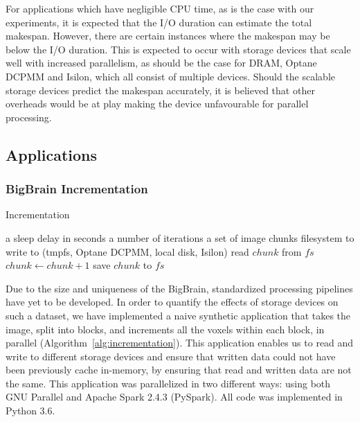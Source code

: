 \documentclass[conference]{IEEEtran}
\newcommand{\Desc}[2]{\State \makebox[2em][l]{#1}#2}
\newcommand{\bigbrain}{BigBrain\xspace}
\begin{document}
For applications which have negligible CPU time, as is the case with our experiments, 
it is expected that the I/O duration can estimate the total makespan. However, there
are certain instances where the makespan may be below the I/O duration. This is expected
to occur with storage devices that scale well with increased parallelism, as should be the
case for DRAM, Optane DCPMM and Isilon, which all consist of multiple devices. Should the
scalable storage devices predict the makespan accurately, it is believed that other overheads
would be at play making the device unfavourable for parallel processing.

\subsection{Applications}
\subsubsection{ \bigbrain Incrementation}

\begin{algorithm}\caption{Incrementation}\label{alg:incrementation}
    \begin{algorithmic}[1]
    \Input
        \Desc{$x$}{a sleep delay in seconds}
        \Desc{$n$}{a number of iterations}
        \Desc{$C$}{a set of image chunks}
        \Desc{$fs$}{filesystem to write to (tmpfs, Optane DCPMM, local disk, Isilon)}
    \EndInput
        \State read $chunk$ from $fs$
        \State $chunk\gets chunk+1$
        \State save $chunk$ to $fs$
    \EndFor
    \end{algorithmic}
\end{algorithm}  

Due to the size and uniqueness of the \bigbrain, standardized processing pipelines
have yet to be developed. In order to quantify the effects of storage devices
on such a dataset, we have implemented a naive synthetic application that takes 
the image, split into blocks, and increments all the voxels within each block, in parallel (Algorithm~\ref{alg:incrementation}).
This application
enables us to read and write to different storage devices and ensure that written
data could not have been previously cache
in-memory, by ensuring that read and written data are not the same. This application
was parallelized in two different ways: using both GNU Parallel and Apache Spark 2.4.3 (PySpark). 
All code was implemented in Python 3.6.
\end{document}
